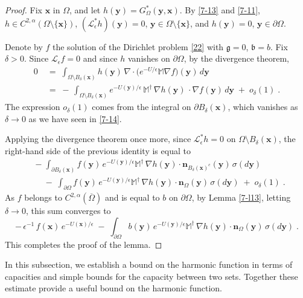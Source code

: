 \documentclass[reqno]{amsart}
\newcounter{as}[section]
\newcommand{\mc}[1]{{\mathcal #1}}
\newcommand{\mf}[1]{{\mathfrak #1}}
\newcommand{\bb}[1]{{\mathbb #1}}
\newcommand{\bs}[1]{{\boldsymbol #1}}
\newcommand{\<}{\langle}
\renewcommand{\>}{\rangle}
\begin{document}
\begin{proof}
Fix $\bs x$ in $\Omega$, and let $h(\bs y) = G^*_{\Omega}(\bs y, \bs
x)$. By \eqref{7-13} and \eqref{7-11}, $h\in
C^{2,\alpha}(\Omega\setminus \{\bs x\})$, $(\mc L^*_\epsilon h)(\bs
y)= 0$, $\bs y\in\Omega\setminus\{\bs x\}$, and $h(\bs y)= 0$, $\bs
y\in\partial \Omega$.

Denote by $f$ the solution of the Dirichlet problem \eqref{22} with
$\mf g=0$, $\mf b = b$. Fix $\delta>0$. Since $\mc L_\epsilon f=0$ and
since $h$ vanishes on $\partial \Omega$, by the divergence theorem,
\begin{align*}
0\; &=\; \int_{\Omega\setminus B_\delta(\bs x)} h(\bs y) \,
\nabla\cdot \big( e^{-U/\epsilon}
\bb M \nabla f  \big) (\bs y) \, d\bs y \\
\; & =\; -\, \int_{\Omega\setminus B_\delta(\bs x)}
e^{-U(\bs y)/\epsilon} \, \bb M^\dagger \,
\nabla h(\bs y) \, \cdot \nabla f (\bs y) \, d\bs y
\;+\; o_\delta(1)\;.
\end{align*}
The expression $o_\delta(1)$ comes from the integral on $\partial
B_\delta(\bs x)$, which vanishes as $\delta\to 0$ as we have seen in
\eqref{7-14}.

Applying the divergence theorem once more, since $\mc L^*_\epsilon
h=0$ on $\Omega\setminus B_\delta(\bs x)$, the right-hand side of the
previous identity is equal to
\begin{align*}
& -\; \int_{\partial B_\delta(\bs x)}  f (\bs y) \, e^{-U(\bs y)/\epsilon} \bb M^\dagger \,
\nabla h(\bs y) \cdot \bs n_{B_\delta(\bs x)^c}(\bs y) \, \sigma(d \bs y) \\
&\quad -\; \int_{\partial \Omega}  f (\bs y) \, e^{-U(\bs y)/\epsilon} \bb M^\dagger \,
\nabla h(\bs y) \cdot \bs n_{\Omega}(\bs y) \, \sigma(d \bs y)
\;+\; o_\delta(1)\;.
\end{align*}
As $f$ belongs to $C^{2,\alpha}(\overline{\Omega})$ and is equal to
$b$ on $\partial \Omega$, by Lemma
\ref{7-l13}, letting $\delta \to 0$, this sum converges to
\begin{equation*}
-\, \epsilon^{-1}\, f (\bs x)\, e^{-U(\bs x)/\epsilon}
\;-\; \int_{\partial \Omega}  b (\bs y) \, e^{-U(\bs y)/\epsilon} \bb M^\dagger \,
\nabla h(\bs y) \cdot \bs n_{\Omega}(\bs y) \, \sigma(d \bs y) \;.
\end{equation*}
This completes the proof of the lemma.
\end{proof}

\smallskip{} In this
subsection, we establish a bound on the harmonic function in terms of
capacities and simple bounds for the capacity between two
sets. Together these estimate provide a useful bound on the harmonic
function.
\end{document}
